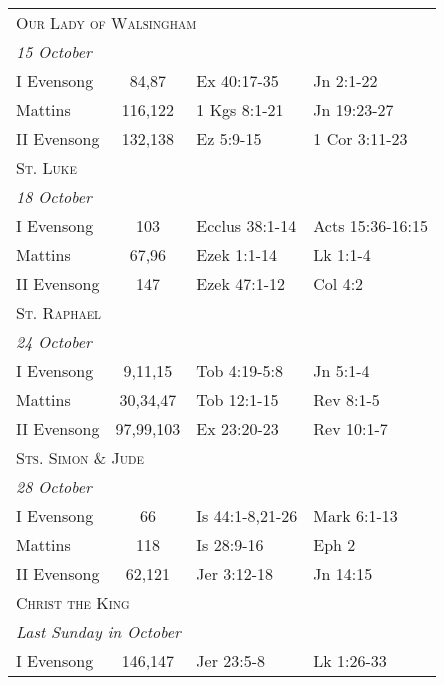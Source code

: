 \begin{longtable}{l c l l}
%
\multicolumn{4}{l}{\textsc{Our Lady of Walsingham}}\\
\multicolumn{4}{l}{\textit{15 October}}\\
\hspace{1em} I Evensong&84,87&Ex 40:17-35&Jn 2:1-22\\
\hspace{1em} Mattins&116,122&1 Kgs 8:1-21&Jn 19:23-27\\
\hspace{1em} II Evensong&132,138&Ez 5:9-15&1 Cor 3:11-23\\
%
\multicolumn{4}{l}{\textsc{St. Luke}}\\
\multicolumn{4}{l}{\textit{18 October}}\\
\hspace{1em} I Evensong&103&Ecclus 38:1-14&Acts 15:36-16:15\\
\hspace{1em} Mattins&67,96&Ezek 1:1-14&Lk 1:1-4\\
\hspace{1em} II Evensong&147&Ezek 47:1-12&Col 4:2\\
%
\multicolumn{4}{l}{\textsc{St. Raphael}}\\
\multicolumn{4}{l}{\textit{24 October}}\\
\hspace{1em} I Evensong&9,11,15&Tob 4:19-5:8&Jn 5:1-4\\
\hspace{1em} Mattins&30,34,47&Tob 12:1-15&Rev 8:1-5\\
\hspace{1em} II Evensong&97,99,103&Ex 23:20-23&Rev 10:1-7\\
%
\multicolumn{4}{l}{\textsc{Sts. Simon \& Jude}}\\
\multicolumn{4}{l}{\textit{28 October}}\\
\hspace{1em} I Evensong&66&Is 44:1-8,21-26&Mark 6:1-13\\
\hspace{1em} Mattins&118&Is 28:9-16&Eph 2\\
\hspace{1em} II Evensong&62,121&Jer 3:12-18&Jn 14:15\\
\multicolumn{4}{l}{\textsc{Christ the King}}\\
\multicolumn{4}{l}{\textit{Last Sunday in October}}\\
\hspace{1em} I Evensong&146,147&Jer 23:5-8&Lk 1:26-33\\

\end{longtable}
